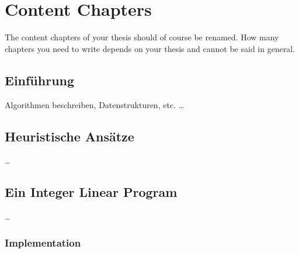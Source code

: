 
\chapter{Content Chapters}
\label{ch:Content1}

The content chapters of your thesis should of course be renamed. How many chapters you need to write depends on your thesis and cannot be said in general.


\section{Einführung}
Algorithmen beschreiben, Datenstrukturen, etc.
\dots

\section{Heuristische Ansätze}

\dots

\section{Ein Integer Linear Program}

\dots

\subsection{Implementation}



